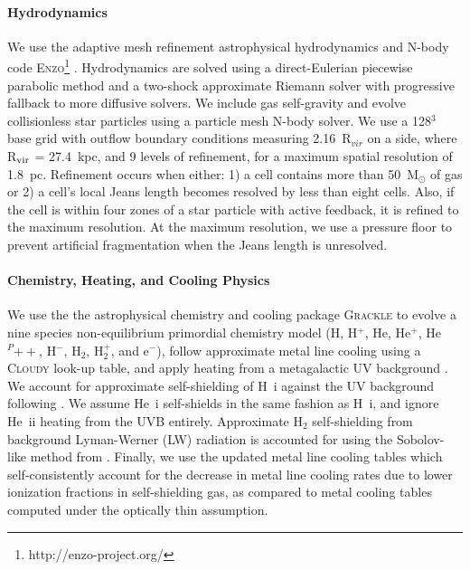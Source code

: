 \paragraph{Hydrodynamics} We use the adaptive mesh refinement astrophysical hydrodynamics and N-body code \textsc{Enzo}\footnote{http://enzo-project.org/} \citep{Enzo2014}. Hydrodynamics are solved using a direct-Eulerian piecewise parabolic method and a two-shock approximate Riemann solver with progressive fallback to more diffusive solvers. We include gas self-gravity and evolve collisionless star particles using a particle mesh N-body solver. We use a 128$^{3}$ base grid with outflow boundary conditions measuring 2.16~R$_{vir}$ on a side, where R$_{\rm vir}$ = 27.4~kpc, and 9 levels of refinement, for a maximum spatial resolution of 1.8~pc. Refinement occurs when either: 1) a cell contains more than 50~M$_{\odot}$ of gas or 2) a cell's local Jeans length becomes resolved by less than eight cells. Also, if the cell is within four zones of a star particle with active feedback, it is refined to the maximum resolution. At the maximum resolution, we use a pressure floor to prevent artificial fragmentation when the Jeans length is unresolved.

\paragraph{Chemistry, Heating, and Cooling Physics} We use the the astrophysical chemistry and cooling package \textsc{Grackle} \citep{GrackleMethod} to evolve a nine species non-equilibrium primordial chemistry model (H, H$^+$, He, He$^+$, He$^P{++}$, H$^-$, H$_2$, H$_2^+$, and e$^-$), follow approximate metal line cooling using a \textsc{Cloudy} look-up table, and apply heating from a metagalactic UV background \citep{HM2012}. We account for approximate self-shielding of H~{\sc i} against the UV background following \cite{Rahmati2013}. We assume He~{\sc i} self-shields in the same fashion as H~{\sc i}, and ignore He~{\sc ii} heating from the UVB entirely. Approximate H$_2$ self-shielding from background Lyman-Werner (LW) radiation is accounted for using the Sobolov-like method from \cite{Wolcott-Green2011}. Finally, we use the updated metal line cooling tables which self-consistently account for the decrease in metal line cooling rates due to lower ionization fractions in self-shielding gas, as compared to metal cooling tables computed under the optically thin assumption.


